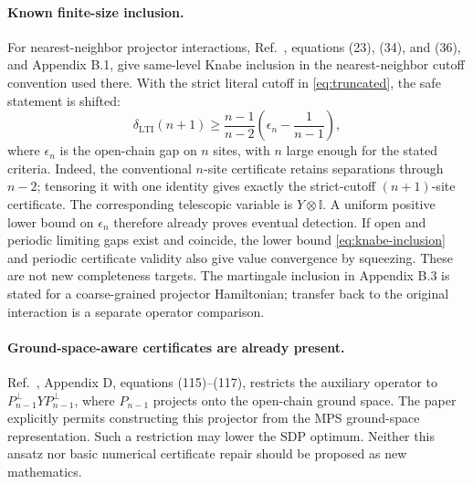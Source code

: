\documentclass{article}
\newcommand{\id}{\mathbb I}
\begin{document}
\paragraph{Known finite-size inclusion.}
For nearest-neighbor projector interactions, Ref.~\cite{LTI}, equations
(23), (34), and (36), and Appendix B.1, give same-level Knabe inclusion
in the nearest-neighbor cutoff convention used there. With the strict
literal cutoff in \eqref{eq:truncated}, the safe statement is shifted:
\begin{equation}
  \delta_{\mathrm{LTI}}(n+1)\geq
  \frac{n-1}{n-2}\left(\epsilon_n-\frac1{n-1}\right),
  \label{eq:knabe-inclusion}
\end{equation}
where $\epsilon_n$ is the open-chain gap on $n$ sites, with $n$ large
enough for the stated criteria. Indeed, the conventional $n$-site
certificate retains separations through $n-2$; tensoring it with one
identity gives exactly the strict-cutoff $(n+1)$-site certificate.
The corresponding telescopic variable is $Y\otimes\id$. A uniform positive
lower bound on $\epsilon_n$ therefore already proves eventual detection.
If open and periodic limiting gaps exist and coincide, the lower bound
\eqref{eq:knabe-inclusion} and periodic certificate validity also give
value convergence by squeezing. These are not new completeness targets.
The martingale inclusion in Appendix B.3 is stated for a coarse-grained
projector Hamiltonian; transfer back to the original interaction is a
separate operator comparison.

\paragraph{Ground-space-aware certificates are already present.}
Ref.~\cite{LTI}, Appendix D, equations (115)--(117), restricts the auxiliary
operator to $P_{n-1}^{\perp}YP_{n-1}^{\perp}$, where $P_{n-1}$ projects
onto the open-chain ground space. The paper explicitly permits constructing
this projector from the MPS ground-space representation. Such a restriction
may lower the SDP optimum. Neither this ansatz nor basic numerical
certificate repair should be proposed as new mathematics.
\end{document}

